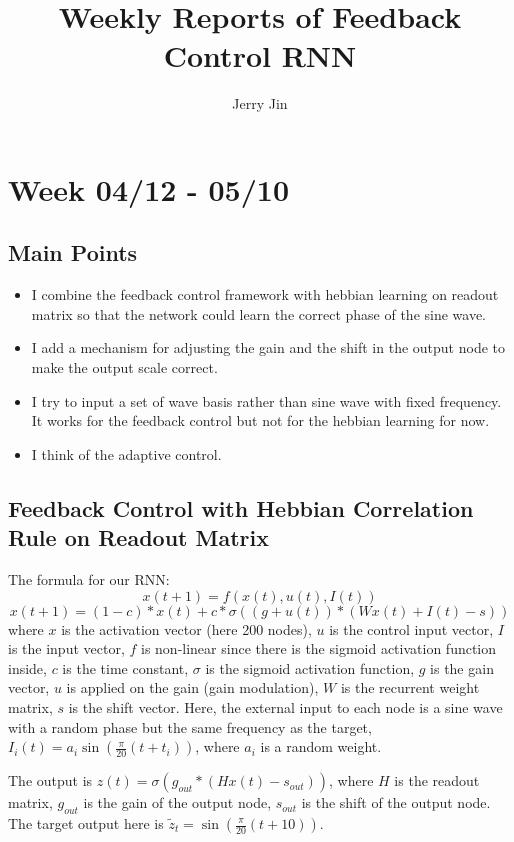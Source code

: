 \documentclass[12pt, a4paper]{article}
\title{Weekly Reports of Feedback Control RNN}
\author{Jerry Jin}
\begin{document}
\maketitle

\section*{Week 04/12 - 05/10}

\subsection*{Main Points}

\noindent
\begin{itemize}
    \item I combine the feedback control framework with hebbian learning on readout matrix so that the network could learn the correct phase of the sine wave.
    \item I add a mechanism for adjusting the gain and the shift in the output node to make the output scale correct.
    \item I try to input a set of wave basis rather than sine wave with fixed frequency. It works for the feedback control but not for the hebbian learning for now.
    \item I think of the adaptive control.

\end{itemize}

\newpage

\subsection*{Feedback Control with Hebbian Correlation Rule on Readout Matrix}

The formula for our RNN:
$$x(t+1) = f(x(t), u(t), I(t))$$
$$x(t+1) = (1-c)*x(t) + c*\sigma((g+u(t)) * (Wx(t) + I(t) - s))$$
where $x$ is the activation vector (here 200 nodes), $u$ is the control input vector, $I$ is the input vector, $f$ is non-linear since there is the sigmoid activation function inside, $c$ is the time constant, $\sigma$ is the sigmoid activation function, $g$ is the gain vector, $u$ is applied on the gain (gain modulation), $W$ is the recurrent weight matrix, $s$ is the shift vector. Here, the external input to each node is a sine wave with a random phase but the same frequency as the target, $I_i(t) = a_i \sin(\frac{\pi}{20}(t+t_i))$, where $a_i$ is a random weight. 

The output is $z(t)=\sigma(g_{out}*(Hx(t)-s_{out}))$, where $H$ is the readout matrix, $g_{out}$ is the gain of the output node, $s_{out}$ is the shift of the output node. The target output here is $\tilde{z}_t = \sin(\frac{\pi}{20}(t+10))$.
\end{document}
